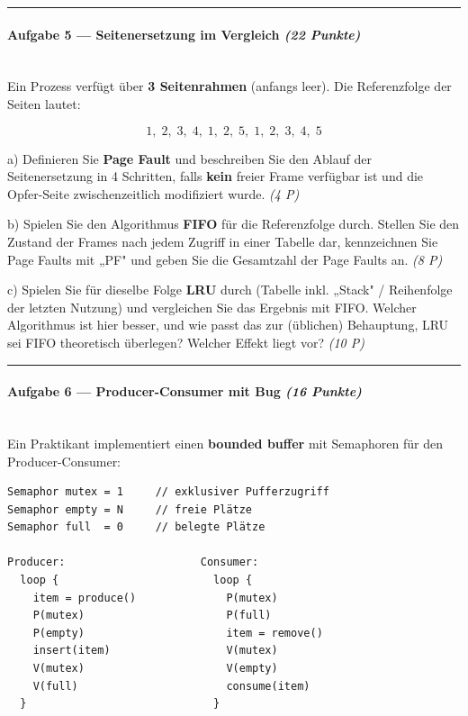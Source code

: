 \documentclass[11pt, a4paper]{article}
\begin{document}
\noindent\textcolor{rulegray}{\rule{\linewidth}{0.4pt}}


\paragraph{Aufgabe 5 — Seitenersetzung im Vergleich \textit{(22 Punkte)}}\mbox{}\\[2pt]

Ein Prozess verfügt über \textbf{3 Seitenrahmen} (anfangs leer). Die Referenzfolge der Seiten lautet:


\[
1,\;2,\;3,\;4,\;1,\;2,\;5,\;1,\;2,\;3,\;4,\;5
\]


a) Definieren Sie \textbf{Page Fault} und beschreiben Sie den Ablauf der Seitenersetzung in 4 Schritten, falls \textbf{kein} freier Frame verfügbar ist und die Opfer-Seite zwischenzeitlich modifiziert wurde. \textit{(4 P)}


b) Spielen Sie den Algorithmus \textbf{FIFO} für die Referenzfolge durch. Stellen Sie den Zustand der Frames nach jedem Zugriff in einer Tabelle dar, kennzeichnen Sie Page Faults mit „PF" und geben Sie die Gesamtzahl der Page Faults an. \textit{(8 P)}


c) Spielen Sie für dieselbe Folge \textbf{LRU} durch (Tabelle inkl. „Stack" / Reihenfolge der letzten Nutzung) und vergleichen Sie das Ergebnis mit FIFO. Welcher Algorithmus ist hier besser, und wie passt das zur (üblichen) Behauptung, LRU sei FIFO theoretisch überlegen? Welcher Effekt liegt vor? \textit{(10 P)}



\noindent\textcolor{rulegray}{\rule{\linewidth}{0.4pt}}


\paragraph{Aufgabe 6 — Producer-Consumer mit Bug \textit{(16 Punkte)}}\mbox{}\\[2pt]

Ein Praktikant implementiert einen \textbf{bounded buffer} mit Semaphoren für den Producer-Consumer:


\begin{lstlisting}
Semaphor mutex = 1     // exklusiver Pufferzugriff
Semaphor empty = N     // freie Plätze
Semaphor full  = 0     // belegte Plätze

Producer:                     Consumer:
  loop {                        loop {
    item = produce()              P(mutex)
    P(mutex)                      P(full)
    P(empty)                      item = remove()
    insert(item)                  V(mutex)
    V(mutex)                      V(empty)
    V(full)                       consume(item)
  }                             }
\end{lstlisting}
\end{document}
